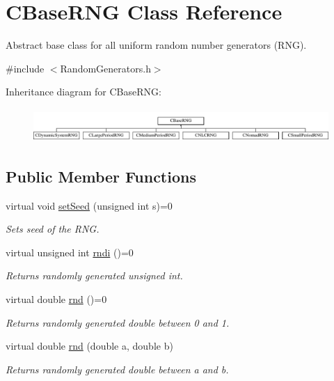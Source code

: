 \hypertarget{class_c_base_r_n_g}{\section{C\-Base\-R\-N\-G Class Reference}
\label{class_c_base_r_n_g}
}


Abstract base class for all uniform random number generators (R\-N\-G).  




{\ttfamily \#include $<$Random\-Generators.\-h$>$}

Inheritance diagram for C\-Base\-R\-N\-G\-:\begin{figure}[H]
\begin{center}
\leavevmode
\includegraphics[height=1.296296cm]{class_c_base_r_n_g}
\end{center}
\end{figure}
\subsection*{Public Member Functions}
\begin{DoxyCompactItemize}
\item 
virtual void \hyperlink{class_c_base_r_n_g_a56fbf75ca07b73954596ee04820e0b07}{set\-Seed} (unsigned int s)=0
\begin{DoxyCompactList}\small\item\em Sets seed of the R\-N\-G. \end{DoxyCompactList}\item 
virtual unsigned int \hyperlink{class_c_base_r_n_g_a2db96fbf06a2f11b3613d422043fb7b8}{rndi} ()=0
\begin{DoxyCompactList}\small\item\em Returns randomly generated unsigned int. \end{DoxyCompactList}\item 
virtual double \hyperlink{class_c_base_r_n_g_abbd60a5ecdc9502dd646434224ab5d6b}{rnd} ()=0
\begin{DoxyCompactList}\small\item\em Returns randomly generated double between 0 and 1. \end{DoxyCompactList}\item 
virtual double \hyperlink{class_c_base_r_n_g_a5712044a0cd9fab6e60b914da7f35fc6}{rnd} (double a, double b)
\begin{DoxyCompactList}\small\item\em Returns randomly generated double between a and b. \end{DoxyCompactList}\end{DoxyCompactItemize}



